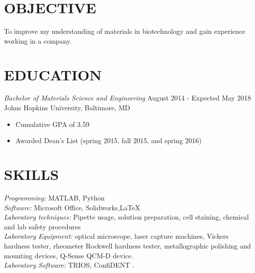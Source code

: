 \documentclass[line, 10pt]{res} %
\begin{document}
\begin{resume}

 
\section{OBJECTIVE}  

To improve my understanding of materials in biotechnology and gain experience working in a company. 


\section{EDUCATION}

{\sl Bachelor of Materials Science and Engineering}  \hfill August 2014 - Expected May 2018 \\
Johns Hopkins University, Baltimore, MD\\
\begin{itemize}
\item Cumulative GPA of 3.59
\item Awarded Dean's List (spring 2015, fall 2015, and spring 2016)
\end{itemize}
 

\section{SKILLS} 

{\sl Programming:} MATLAB, Python \\
{\sl Software:}  Microsoft Office, Solidworks,\LaTeX\\
{\sl Laboratory techniques:} Pipette usage, solution preparation, cell staining, chemical and lab safety procedures \\
{\sl Laboratory Equipment:} optical microscope, laser capture machines, Vickers hardness tester, rheometer Rockwell hardness tester, metallographic polishing and mounting devices, Q-Sense QCM-D device.\\
{\sl Laboratory Software:} TRIOS, ConfiDENT .\\
 

\end{resume}
\end{document}

